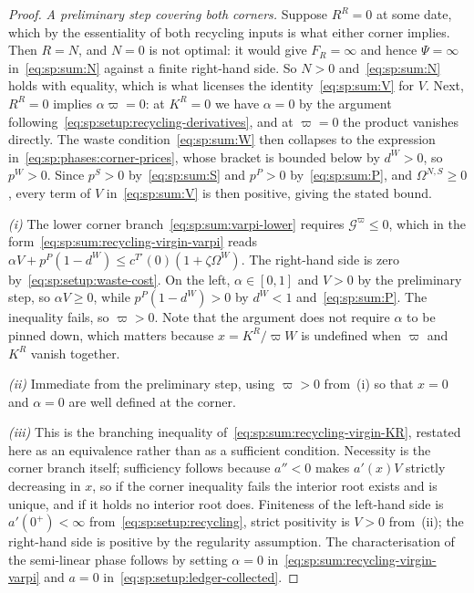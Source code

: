 \begin{proof}
\emph{A preliminary step covering both corners.} Suppose $R^R=0$ at some date, which by the
essentiality of both recycling inputs is what either corner implies. Then $R=N$, and $N=0$ is not
optimal: it would give $F_R=\infty$ and hence $\Psi=\infty$ in~\eqref{eq:sp:sum:N} against a finite
right-hand side. So $N>0$ and~\eqref{eq:sp:sum:N} holds with equality, which is what licenses the
identity~\eqref{eq:sp:sum:V} for $V$. Next, $R^R=0$ implies $\alpha\varpi=0$: at $K^R=0$ we have
$\alpha=0$ by the argument following~\eqref{eq:sp:setup:recycling-derivatives}, and at $\varpi=0$ the
product vanishes directly. The waste condition~\eqref{eq:sp:sum:W} then collapses to the expression
in~\eqref{eq:sp:phases:corner-prices}, whose bracket is bounded below by $d^W>0$, so $p^W>0$. Since
$p^S>0$ by~\eqref{eq:sp:sum:S} and $p^P>0$ by~\eqref{eq:sp:sum:P}, and $\Omega^{N,S}\ge0$, every term
of $V$ in~\eqref{eq:sp:sum:V} is then positive, giving the stated bound.

\emph{(i)} The lower corner branch~\eqref{eq:sp:sum:varpi-lower} requires
$\mathcal G^\varpi\le0$, which in the form~\eqref{eq:sp:sum:recycling-virgin-varpi} reads
$\alpha V+p^P\left(1-d^W\right)\le c^{T\prime}\left(0\right)\left(1+\zeta\Omega^W\right)$. The
right-hand side is zero by~\eqref{eq:sp:setup:waste-cost}. On the left, $\alpha\in\left[0,1\right]$ and
$V>0$ by the preliminary step, so $\alpha V\ge0$, while $p^P\left(1-d^W\right)>0$ by $d^W<1$
and~\eqref{eq:sp:sum:P}. The inequality fails, so $\varpi>0$. Note that the argument does not require
$\alpha$ to be pinned down, which matters because $x=K^R/\varpi W$ is undefined when $\varpi$ and
$K^R$ vanish together.

\emph{(ii)} Immediate from the preliminary step, using $\varpi>0$ from~(i) so that $x=0$ and
$\alpha=0$ are well defined at the corner.

\emph{(iii)} This is the branching inequality
of~\eqref{eq:sp:sum:recycling-virgin-KR}, restated here as an equivalence rather than as a
sufficient condition. Necessity is the corner branch itself; sufficiency follows because $a''<0$
makes $a'\left(x\right)V$ strictly decreasing in $x$, so if the corner inequality fails the interior
root exists and is unique, and if it holds no interior root does. Finiteness of the left-hand side is
$a'\left(0^+\right)<\infty$ from~\eqref{eq:sp:setup:recycling}, strict positivity is $V>0$ from~(ii);
the right-hand side is positive by the regularity assumption. The characterisation of the semi-linear
phase follows by setting $\alpha=0$ in~\eqref{eq:sp:sum:recycling-virgin-varpi} and $a=0$
in~\eqref{eq:sp:setup:ledger-collected}.


\end{proof}
